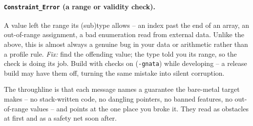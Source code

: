 \paragraph{\texttt{Constraint\_Error} (a range or validity check).}
A value left the range its (sub)type allows -- an index past the end of an array,
an out-of-range assignment, a bad enumeration read from external data. Unlike the
above, this is almost always a genuine bug in your data or arithmetic rather than a
profile rule. \emph{Fix:} find the offending value; the type told you its range, so
the check is doing its job. Build with checks on (\texttt{-gnata}) while developing
-- a release build may have them off, turning the same mistake into silent
corruption.

The throughline is that each message names a guarantee the bare-metal target makes
-- no stack-written code, no dangling pointers, no banned features, no out-of-range
values -- and points at the one place you broke it. They read as obstacles at first
and as a safety net soon after.
